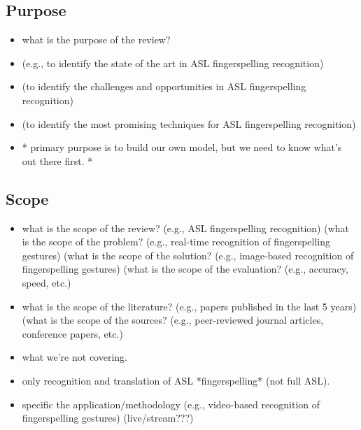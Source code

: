 \subsection{Purpose}

\begin{itemize}
    \item what is the purpose of the review?
    \item (e.g., to identify the state of the art in ASL fingerspelling recognition)
    \item (to identify the challenges and opportunities in ASL fingerspelling recognition)
    \item (to identify the most promising techniques for ASL fingerspelling recognition)
    \item * primary purpose is to build our own model, but we need to know what's out there first. *

\end{itemize}
\subsection{Scope}
\begin{itemize}
    \item what is the scope of the review? (e.g., ASL fingerspelling recognition) (what is the scope of the problem? (e.g., real-time recognition of fingerspelling gestures) (what is the scope of the solution? (e.g., image-based recognition of fingerspelling gestures) (what is the scope of the evaluation? (e.g., accuracy, speed, etc.)
    \item what is the scope of the literature? (e.g., papers published in the last 5 years) (what is the scope of the sources? (e.g., peer-reviewed journal articles, conference papers, etc.)
    \item what we're not covering.
    \item only recognition and translation of ASL *fingerspelling* (not full ASL).
    \item specific the application/methodology (e.g., video-based recognition of fingerspelling gestures) (live/stream???)
\end{itemize}

